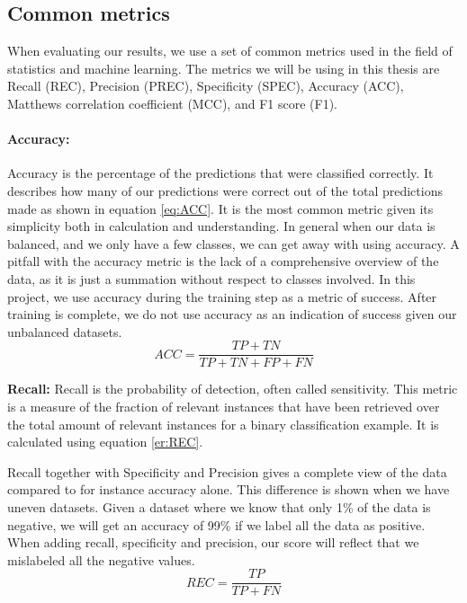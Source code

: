 \subsection{Common metrics}
\label{cha:metrics}
When evaluating our results, we use a set of common metrics used in the field of statistics and machine learning.  The metrics we will be using in this thesis are Recall (REC), Precision (PREC), Specificity (SPEC), Accuracy (ACC), Matthews correlation coefficient (MCC), and F1 score (F1). 


\vspace{5px}
\paragraph{Accuracy:}  
Accuracy is the percentage of the predictions that were classified correctly.
It describes how many of our predictions were correct out of the total predictions made as shown in equation \ref{eq:ACC}. It is the most common metric given its simplicity both in calculation and understanding. 
In general when our data is balanced, and we only have a few classes, we can get away with using accuracy.
A pitfall with the accuracy metric is the lack of a comprehensive overview of the data, as it is just a summation without respect to classes involved.
In this project, we use accuracy during the training step as a metric of success. After training is complete, we do not use accuracy as an indication of success given our unbalanced datasets. 
 \begin{equation}
ACC=\frac{TP+TN}{TP+TN+FP+FN}
\label{eq:ACC}
\end{equation}

\vspace{5px}
\textbf{Recall:}  
Recall is the probability of detection, often called sensitivity.
This metric is a measure of the fraction of relevant instances that have been retrieved over the total amount of relevant instances for a binary classification example. It is calculated using equation \ref{er:REC}.

Recall together with Specificity and Precision gives a complete view of the data compared to for instance accuracy alone. This difference is shown when we have uneven datasets. Given a dataset where we know that only 1\% of the data is negative, we will get an accuracy of 99\% if we label all the data as positive. When adding recall, specificity and precision, our score will reflect that we mislabeled all the negative values.
\begin{equation}
REC=\frac{TP}{TP+FN}
\label{eq:REC}
\end{equation}





